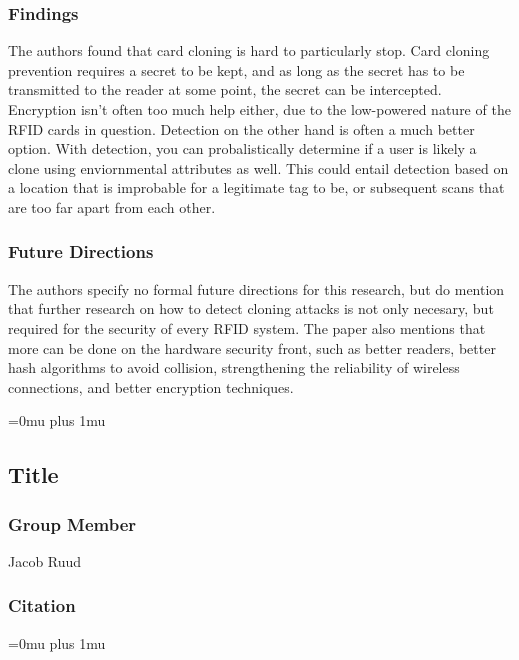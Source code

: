 \subsubsection{Findings}

\noindent
 The authors found that card cloning is hard to particularly stop.  Card cloning prevention requires a secret to be kept, and as long as the secret has to be transmitted to the reader at some point, the secret can be intercepted.  Encryption isn't often too much help either, due to the low-powered nature of the RFID cards in question.  Detection on the other hand is often a much better option.  With detection, you can probalistically determine if a user is likely a clone using enviornmental attributes as well.  This could entail detection based on a location that is improbable for a legitimate tag to be, or subsequent scans that are too far apart from each other.

\subsubsection{Future Directions}

\noindent
 The authors specify no formal future directions for this research, but do mention that further research on how to detect cloning attacks is not only necesary, but required for the security of every RFID system.  The paper also mentions that more can be done on the hardware security front, such as better readers, better hash algorithms to avoid collision, strengthening the reliability of wireless connections, and better encryption techniques. 

\Urlmuskip=0mu plus 1mu\relax

\noindent
\subsection{Title}

\subsubsection{Group Member}

\noindent
Jacob Ruud

\noindent
\subsubsection{Citation}

\Urlmuskip=0mu plus 1mu\relax

